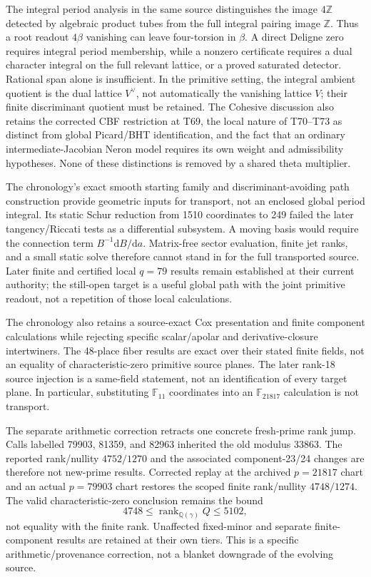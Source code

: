 \documentclass[11pt]{article}
\theoremstyle{definition}
\theoremstyle{remark}
\newcommand{\dd}{\mathrm d}
\begin{document}
The integral period analysis in the same source distinguishes the image
\(4\mathbb Z\) detected by algebraic product tubes from the full integral
pairing image \(\mathbb Z\).  Thus a root readout \(4\beta\) vanishing
can leave four-torsion in \(\beta\).  A direct Deligne zero requires
integral period membership, while a nonzero certificate requires a dual
character integral on the full relevant lattice, or a proved saturated
detector.  Rational span alone is insufficient.  In the primitive setting,
the integral ambient quotient is the dual lattice \(V^\vee\), not
automatically the vanishing lattice \(V\); their finite discriminant
quotient must be retained.  The Cohesive discussion \cite{NeroCohesive2026}
also retains the corrected CBF restriction at T69, the local nature of
T70--T73 as distinct from global Picard/BHT identification, and the fact
that an ordinary intermediate-Jacobian Neron model requires its own
weight and admissibility hypotheses.  None of these distinctions is
removed by a shared theta multiplier.

The chronology's exact smooth starting family and discriminant-avoiding
path construction provide geometric inputs for transport, not an enclosed
global period integral.  Its static Schur reduction from 1510 coordinates
to 249 failed the later tangency/Riccati tests as a differential subsystem.
A moving basis would require the connection term \(B^{-1}\dd B/\dd a\).
Matrix-free sector evaluation, finite jet ranks, and a small static solve
therefore cannot stand in for the full transported source.  Later finite
and certified local \(q=79\) results remain established at their current
authority; the still-open target is a useful global path with the joint
primitive readout, not a repetition of those local calculations.

The chronology also retains a source-exact Cox presentation and finite
component calculations while rejecting specific scalar/apolar and
derivative-closure intertwiners.  The 48-place fiber results are exact over
their stated finite fields, not an equality of characteristic-zero
primitive source planes.  The later rank-18 source injection is a
same-field statement, not an identification of every target plane.  In
particular, substituting \(\mathbb F_{11}\) coordinates into an
\(\mathbb F_{21817}\) calculation is not transport.

The separate arithmetic correction \cite{FRG3GM} retracts one concrete
fresh-prime rank jump.  Calls labelled 79903, 81359, and 82963 inherited
the old modulus 33863.  The reported rank/nullity \(4752/1270\) and the
associated component-23/24 changes are therefore not new-prime results.
Corrected replay at the archived \(p=21817\) chart and an actual
\(p=79903\) chart restores the scoped finite rank/nullity \(4748/1274\).
The valid characteristic-zero conclusion remains the bound
\[
4748\le\operatorname{rank}_{\mathbb Q(\gamma)}Q\le5102,
\]
not equality with the finite rank.  Unaffected fixed-minor and separate
finite-component results are retained at their own tiers.  This is a
specific arithmetic/provenance correction, not a blanket downgrade of the
evolving source.
\end{document}
